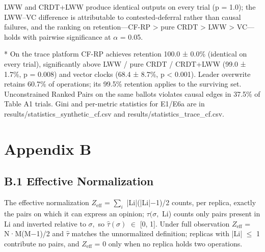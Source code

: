 \documentclass[11pt]{article}
\begin{document}
LWW and CRDT+LWW produce identical outputs on every trial (p = 1.0); the LWW–VC difference is attributable to contested-deferral rather than causal failures, and the ranking on retention—CF-RP > pure CRDT > LWW > VC—holds with pairwise significance at $\alpha $ = 0.05.

\begin{table}[t]
\centering
\caption{Table A6. Trace E2 (N = 8, M = 24, n = 30, partial ballots, no dissemination): ordering-information retention by strategy—mean ± std, 95\% CI, and two-sided Wilcoxon p versus CF-RP.}
\label{tbl:13}
\end{table}

* On the trace platform CF-RP achieves retention 100.0 ± 0.0\% (identical on every trial), significantly above LWW / pure CRDT / CRDT+LWW (99.0 ± 1.7\%, p = 0.008) and vector clocks (68.4 ± 8.7\%, p < 0.001). Leader overwrite retains 60.7\% of operations; its 99.5\% retention applies to the surviving set. Unconstrained Ranked Pairs on the same ballots violates causal edges in 37.5\% of Table A1 trials. Gini and per-metric statistics for E1/E6a are in results/statistics\_synthetic\_cf.csv and results/statistics\_trace\_cf.csv.

\section*{Appendix B}
\subsection{B.1 Effective Normalization}
The effective normalization $Z_{\mathrm{eff}}$ = $\sum_{i} $ |Li|(|Li|−1)/2 counts, per replica, exactly the pairs on which it can express an opinion; $\tau (\sigma ,$ Li) counts only pairs present in Li and inverted relative to $\sigma ,$ so $\hat{\tau}(\sigma )$ $\in $ [0, 1]. Under full observation $Z_{\mathrm{eff}}$ = N·M(M−1)/2 and $\hat{\tau}$ matches the unnormalized definition; replicas with |Li| $\leq $ 1 contribute no pairs, and $Z_{\mathrm{eff}}$ = 0 only when no replica holds two operations.
\end{document}
